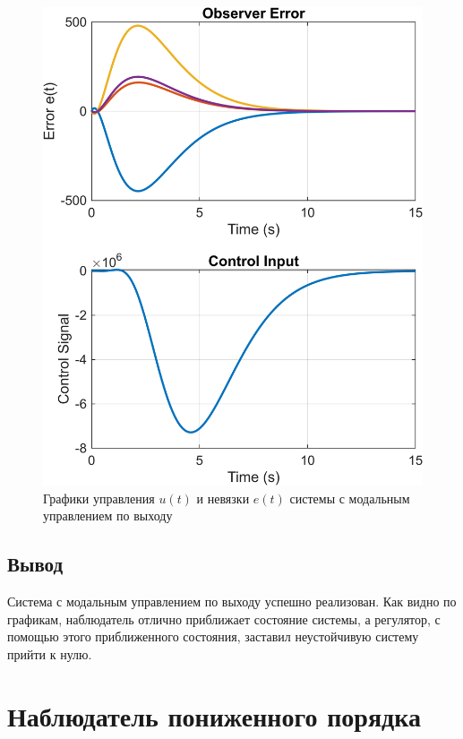 \begin{figure}[H]
    \centering
    \includegraphics[width=0.7\linewidth]{figs/task3_2.png}
    \caption{Графики управления $u(t)$ и невязки $e(t)$ системы с модальным 
    управлением по выходу}
    \label{fig:3_2}
\end{figure}

\subsection{Вывод}

Система с модальным управлением по выходу успешно реализован.
Как видно по графикам, наблюдатель отлично приближает состояние
системы, а регулятор, с помощью этого приближенного состояния,
заставил неустойчивую систему прийти к нулю.



\section{Наблюдатель пониженного порядка}

